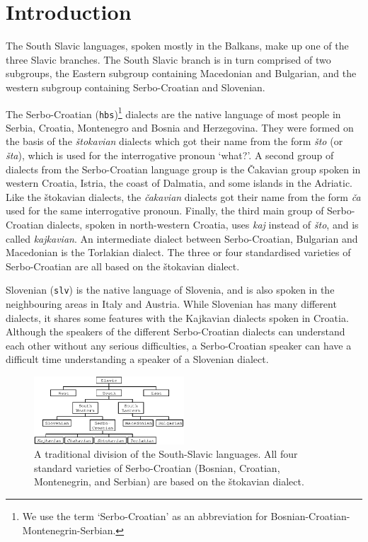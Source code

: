 
\section{Introduction}

The South Slavic languages, spoken mostly in the Balkans, make up one of the three Slavic 
branches. The South Slavic branch is in turn comprised of two subgroups, the Eastern 
subgroup containing Macedonian and Bulgarian, and the western subgroup containing 
Serbo-Croatian and Slovenian.

The Serbo-Croatian (\texttt{hbs})\footnote{We use the term `Serbo-Croatian' as an abbreviation for
Bosnian-Croatian-Montenegrin-Serbian.} 
dialects are the native language of most people in Serbia, Croatia, 
Montenegro and Bosnia and Herzegovina. They were formed on the basis of the \emph{štokavian} dialects 
which got their name from the form \emph{što} (or \emph{šta}), which is used for the 
interrogative pronoun `what?'. A second group of dialects from the Serbo-Croatian language group 
is the Čakavian group spoken in western Croatia, Istria, the coast of Dalmatia, and some 
islands in the Adriatic. Like the štokavian dialects, the \emph{čakavian} dialects got their name 
from the form \emph{ča} used for the same interrogative pronoun. Finally, the third main group 
of Serbo-Croatian dialects, spoken in north-western Croatia, uses \emph{kaj} instead of \emph{što}, 
and is called \emph{kajkavian}.
An intermediate dialect between Serbo-Croatian, Bulgarian and Macedonian is the Torlakian dialect.
The three or four standardised varieties of Serbo-Croatian are all based on the štokavian dialect.

Slovenian (\texttt{slv}) is the native language of Slovenia, and is also spoken in the neighbouring areas in Italy and Austria. While Slovenian has many different dialects, it shares some features with the Kajkavian dialects spoken in Croatia. Although the speakers of the different Serbo-Croatian dialects can understand each other without any serious difficulties, a Serbo-Croatian speaker can have a difficult time understanding a speaker of a Slovenian dialect.

\begin{figure}
\centering
\includegraphics[width=0.5\textwidth]{images/chart.eps}
\caption{A traditional division of the South-Slavic languages. All four standard varieties
     of Serbo-Croatian (Bosnian, Croatian, Montenegrin, and Serbian) are based on the 
     štokavian dialect.}
\end{figure}

